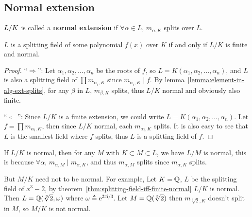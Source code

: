 \subsection{Normal extension}

\begin{definition}
  ${L}/{K}$ is called a {\bf normal extension}
  if $\forall \alpha \in L$, $m_{\alpha, K}$ splits over $L$.
\end{definition}

\begin{theorem} \label{thm:splitting-field-iff-finite-normal}
  $L$ is a splitting field of some polynomial $f(x)$ over $K$ if
  and only if $L/K$ is finite and normal.

  \begin{proof}
    ``$\Rightarrow$'': Let $\alpha_1, \alpha_2, \dots, \alpha_n$ be the roots of $f$,
    so $L = K(\alpha_1, \alpha_2, \dots, \alpha_n)$, and $L$ is also a splitting field
    of $\prod m_{\alpha_i, K}$ since $m_{\alpha_i, K} \mid f$. By lemma~\ref{lemma:element-in-alg-ext-splits},
    for any $\beta$ in $L$, $m_{\beta, K}$ splits, thus $L/K$ normal and obviously also finite.

    ``$\Leftarrow$'': Since $L/K$ is a finite extension, we could write
    $L = K(\alpha_1, \alpha_2, \dots, \alpha_n)$. Let $f = \prod m_{\alpha_i, K}$, then
    since $L/K$ normal, each $m_{\alpha_i, K}$ splits. It is also easy to see that $L$
    is the smallest field where $f$ splits, thus $L$ is a splitting field of $f$.
  \end{proof}
\end{theorem}

\begin{remark}
  If $L/K$ is normal, then for any $M$ with $K \subset M \subset L$, we have $L/M$ is normal,
  this is because $\forall \alpha, \, m_{\alpha, M} \mid m_{\alpha, K}$, and thus
  $m_{\alpha, M}$ splits since $m_{\alpha, K}$ splits.

  But $M/K$ need not to be normal. For example, Let $K = \mathbb{Q}$, $L$ be the splitting field of $x^3 - 2$,
  by theorem~\ref{thm:splitting-field-iff-finite-normal} $L/K$ is normal.
  Then $L = \mathbb{Q}(\sqrt[3]{2}, \omega)$ where $\omega \triangleq \mathrm{e}^{2 \pi \mathrm{i} / 3}$.
  Let $M = \mathbb{Q}(\sqrt[3]{2})$ then $m_{\sqrt[3]{2}, K}$ doesn't split in $M$, so $M/K$ is not normal.
\end{remark}

